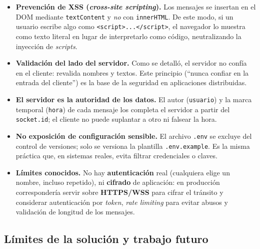 \documentclass[12pt,a4paper]{article}
\begin{document}
\begin{itemize}[leftmargin=1.4em]
    \item \textbf{Prevención de XSS (\textit{cross-site scripting}).} Los mensajes se insertan en el DOM mediante \texttt{textContent} y \emph{no} con \texttt{innerHTML}. De este modo, si un usuario escribe algo como \verb|<script>...</script>|, el navegador lo muestra como texto literal en lugar de interpretarlo como código, neutralizando la inyección de \textit{scripts}.
    \item \textbf{Validación del lado del servidor.} Como se detalló, el servidor no confía en el cliente: revalida nombres y textos. Este principio (``nunca confiar en la entrada del cliente'') es la base de la seguridad en aplicaciones distribuidas.
    \item \textbf{El servidor es la autoridad de los datos.} El autor (\texttt{usuario}) y la marca temporal (\texttt{hora}) de cada mensaje los completa el servidor a partir del \texttt{socket.id}; el cliente no puede suplantar a otro ni falsear la hora.
    \item \textbf{No exposición de configuración sensible.} El archivo \texttt{.env} se excluye del control de versiones; solo se versiona la plantilla \texttt{.env.example}. Es la misma práctica que, en sistemas reales, evita filtrar credenciales o claves.
    \item \textbf{Límites conocidos.} No hay \textbf{autenticación} real (cualquiera elige un nombre, incluso repetido), ni \textbf{cifrado} de aplicación: en producción correspondería servir sobre \textbf{HTTPS/WSS} para cifrar el tránsito y considerar autenticación por \textit{token}, \textit{rate limiting} para evitar abusos y validación de longitud de los mensajes.
\end{itemize}

\subsection{Límites de la solución y trabajo futuro}
\end{document}
